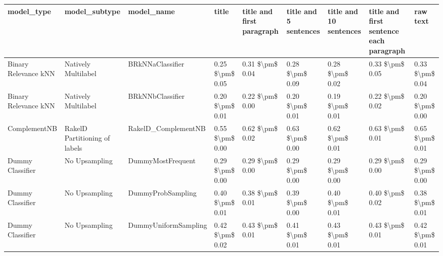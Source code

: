 \begin{tabular}{lllllllll}
\toprule
                     model\_type &                 model\_subtype &                                   model\_name &           title & title and first paragraph & title and 5 sentences & title and 10 sentences & title and first sentence each paragraph &            raw text \\
\midrule
           Binary Relevance kNN &           Natively Multilabel &                             BRkNNaClassifier & 0.25 \$\textbackslash pm\$ 0.05 &           0.31 \$\textbackslash pm\$ 0.04 &       0.28 \$\textbackslash pm\$ 0.09 &        0.28 \$\textbackslash pm\$ 0.02 &                         0.33 \$\textbackslash pm\$ 0.05 &     0.33 \$\textbackslash pm\$ 0.04 \\
           Binary Relevance kNN &           Natively Multilabel &                             BRkNNbClassifier & 0.20 \$\textbackslash pm\$ 0.01 &           0.22 \$\textbackslash pm\$ 0.00 &       0.20 \$\textbackslash pm\$ 0.01 &        0.19 \$\textbackslash pm\$ 0.01 &                         0.22 \$\textbackslash pm\$ 0.02 &     0.20 \$\textbackslash pm\$ 0.00 \\
                   ComplementNB & RakelD Partitioning of labels &                          RakelD\_ComplementNB & 0.55 \$\textbackslash pm\$ 0.00 &           0.62 \$\textbackslash pm\$ 0.02 &       0.63 \$\textbackslash pm\$ 0.00 &        0.62 \$\textbackslash pm\$ 0.01 &                         0.63 \$\textbackslash pm\$ 0.01 &     0.65 \$\textbackslash pm\$ 0.01 \\
               Dummy Classifier &                 No Upsampling &                            DummyMostFrequent & 0.29 \$\textbackslash pm\$ 0.00 &           0.29 \$\textbackslash pm\$ 0.00 &       0.29 \$\textbackslash pm\$ 0.00 &        0.29 \$\textbackslash pm\$ 0.00 &                         0.29 \$\textbackslash pm\$ 0.00 &     0.29 \$\textbackslash pm\$ 0.00 \\
               Dummy Classifier &                 No Upsampling &                            DummyProbSampling & 0.40 \$\textbackslash pm\$ 0.01 &           0.38 \$\textbackslash pm\$ 0.01 &       0.39 \$\textbackslash pm\$ 0.00 &        0.40 \$\textbackslash pm\$ 0.01 &                         0.40 \$\textbackslash pm\$ 0.02 &     0.38 \$\textbackslash pm\$ 0.01 \\
               Dummy Classifier &                 No Upsampling &                         DummyUniformSampling & 0.42 \$\textbackslash pm\$ 0.02 &           0.43 \$\textbackslash pm\$ 0.01 &       0.41 \$\textbackslash pm\$ 0.01 &        0.43 \$\textbackslash pm\$ 0.01 &                         0.43 \$\textbackslash pm\$ 0.01 &     0.42 \$\textbackslash pm\$ 0.01 \\

\end{tabular}
